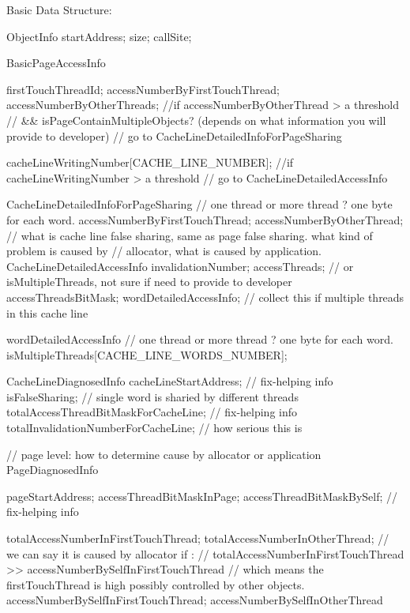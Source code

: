 Basic Data Structure:

        ObjectInfo {
            startAddress;
            size;
            callSite;
        }

        BasicPageAccessInfo {
            firstTouchThreadId;
            accessNumberByFirstTouchThread;
            accessNumberByOtherThreads;
            //if accessNumberByOtherThread > a threshold
            //  && isPageContainMultipleObjects? (depends on what information you will provide to developer)
            //       go to CacheLineDetailedInfoForPageSharing

            cacheLineWritingNumber[CACHE_LINE_NUMBER];
            //if cacheLineWritingNumber > a threshold
            //      go to CacheLineDetailedAccessInfo
        }

        CacheLineDetailedInfoForPageSharing {
            // one thread or more thread ? one byte for each word.
            accessNumberByFirstTouchThread;
            accessNumberByOtherThread;
        }
        // what is cache line false sharing, same as page false sharing. what kind of problem is caused by
        // allocator, what is caused by application.
        CacheLineDetailedAccessInfo {
            invalidationNumber;
            accessThreads;  // or isMultipleThreads, not sure if need to provide to developer
            accessThreadsBitMask;
            wordDetailedAccessInfo;  // collect this if multiple threads in this cache line
        }

        wordDetailedAccessInfo {
            // one thread or more thread ? one byte for each word.
            isMultipleThreads[CACHE_LINE_WORDS_NUMBER];
        }

        CacheLineDiagnosedInfo {
            cacheLineStartAddress;  // fix-helping info
            isFalseSharing;  // single word is sharied by different threads
            totalAccessThreadBitMaskForCacheLine;   // fix-helping info
            totalInvalidationNumberForCacheLine;  // how serious this is
        }

// page level: how to determine cause by allocator or application
        PageDiagnosedInfo {
            pageStartAddress;
            accessThreadBitMaskInPage;
            accessThreadBitMaskBySelf; // fix-helping info

            totalAccessNumberInFirstTouchThread;
            totalAccessNumberInOtherThread;
            // we can say it is caused by allocator if :
            // totalAccessNumberInFirstTouchThread >> accessNumberBySelfInFirstTouchThread
            // which means the firstTouchThread is high possibly controlled by other objects.
            accessNumberBySelfInFirstTouchThread;
            accessNumberBySelfInOtherThread
        }


